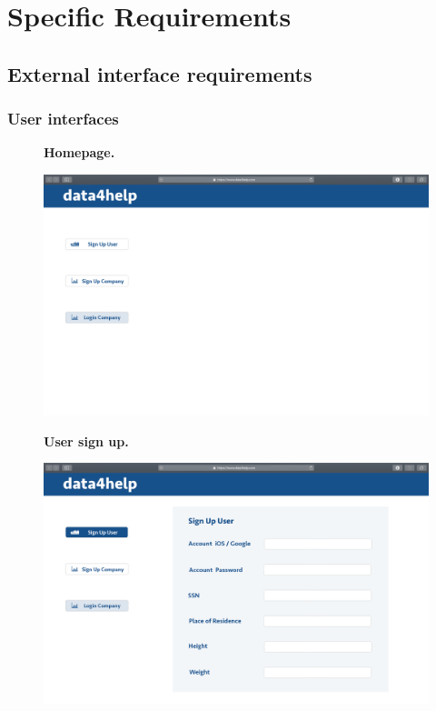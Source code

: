 \documentclass{article}
\begin{document}
\section{Specific Requirements}
\subsection{External interface requirements}
\subsubsection{User interfaces}
\begin{figure}[h!]
\centering
    \textbf{Homepage.}\par\medskip
	\includegraphics[width= \linewidth]{1homepage.png}
\end{figure}
\begin{figure}[h!]
\centering
    \textbf{User sign up.}\par\medskip
	\includegraphics[width= \linewidth]{2signupuser.png}
\end{figure}\newpage
\end{document}
